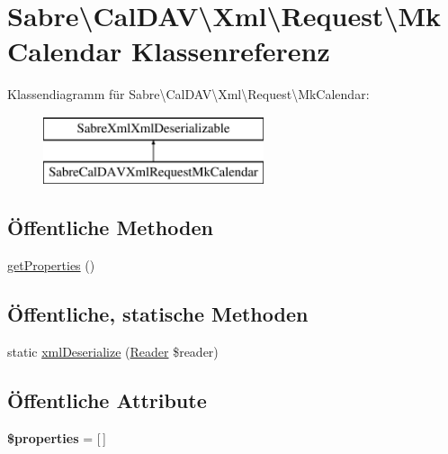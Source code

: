 \hypertarget{class_sabre_1_1_cal_d_a_v_1_1_xml_1_1_request_1_1_mk_calendar}{}\section{Sabre\textbackslash{}Cal\+D\+AV\textbackslash{}Xml\textbackslash{}Request\textbackslash{}Mk\+Calendar Klassenreferenz}
\label{class_sabre_1_1_cal_d_a_v_1_1_xml_1_1_request_1_1_mk_calendar}
Klassendiagramm für Sabre\textbackslash{}Cal\+D\+AV\textbackslash{}Xml\textbackslash{}Request\textbackslash{}Mk\+Calendar\+:\begin{figure}[H]
\begin{center}
\leavevmode
\includegraphics[height=2.000000cm]{class_sabre_1_1_cal_d_a_v_1_1_xml_1_1_request_1_1_mk_calendar}
\end{center}
\end{figure}
\subsection*{Öffentliche Methoden}
\begin{DoxyCompactItemize}
\item 
\mbox{\hyperlink{class_sabre_1_1_cal_d_a_v_1_1_xml_1_1_request_1_1_mk_calendar_a3317d270aa072febbfdff2f0f8850b73}{get\+Properties}} ()
\end{DoxyCompactItemize}
\subsection*{Öffentliche, statische Methoden}
\begin{DoxyCompactItemize}
\item 
static \mbox{\hyperlink{class_sabre_1_1_cal_d_a_v_1_1_xml_1_1_request_1_1_mk_calendar_a5ab27ded4ef932547ef3accc5a3fc13c}{xml\+Deserialize}} (\mbox{\hyperlink{class_sabre_1_1_xml_1_1_reader}{Reader}} \$reader)
\end{DoxyCompactItemize}
\subsection*{Öffentliche Attribute}
\begin{DoxyCompactItemize}
\item 
\mbox{\label{class_sabre_1_1_cal_d_a_v_1_1_xml_1_1_request_1_1_mk_calendar_afcc166f935de19e7a82d3c44dbc513bf}} 
{\bfseries \$properties} = \mbox{[}$\,$\mbox{]}
\end{DoxyCompactItemize}


